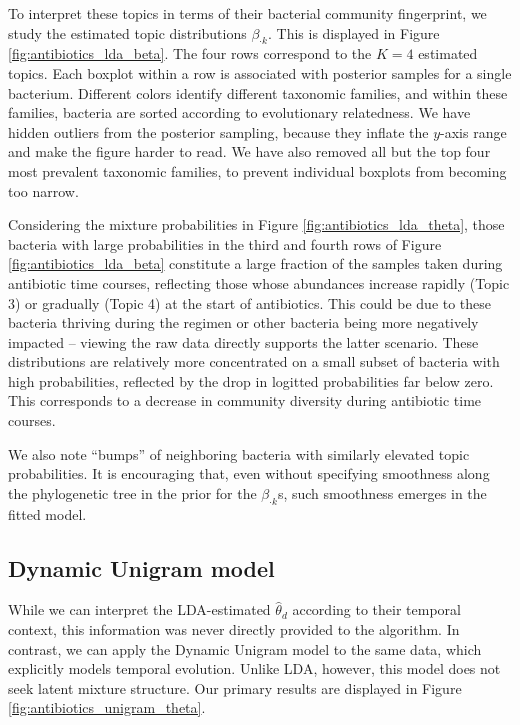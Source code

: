 \documentclass[oupdraft]{bio}
\begin{document}
To interpret these topics in terms of their bacterial community fingerprint, we
study the estimated topic distributions $\beta_{\cdot k}$. This is displayed in
Figure \ref{fig:antibiotics_lda_beta}. The four rows correspond to the $K = 4$
estimated topics. Each boxplot within a row is associated with posterior samples
for a single bacterium. Different colors identify different taxonomic families,
and within these families, bacteria are sorted according to evolutionary
relatedness. We have hidden outliers from the posterior sampling, because they
inflate the $y$-axis range and make the figure harder to read. We have also
removed all but the top four most prevalent taxonomic families, to prevent
individual boxplots from becoming too narrow.

Considering the mixture probabilities in Figure \ref{fig:antibiotics_lda_theta},
those bacteria with large probabilities in the third and fourth rows of Figure
\ref{fig:antibiotics_lda_beta} constitute a large fraction of the samples taken
during antibiotic time courses, reflecting those whose abundances increase
rapidly (Topic 3) or gradually (Topic 4) at the start of antibiotics. This could
be due to these bacteria thriving during the regimen or other bacteria being
more negatively impacted -- viewing the raw data directly supports the latter
scenario. These distributions are relatively more concentrated on a small subset
of bacteria with high probabilities, reflected by the drop in logitted
probabilities far below zero. This corresponds to a decrease in community
diversity during antibiotic time courses.

We also note ``bumps'' of neighboring bacteria with similarly elevated topic
probabilities. It is encouraging that, even without specifying smoothness along
the phylogenetic tree in the prior for the $\beta_{\cdot k}$s, such smoothness
emerges in the fitted model.

\subsection{Dynamic Unigram model}
\label{sec:antibiotics_unigram}

While we can interpret the LDA-estimated $\hat{\theta}_{d}$ according to their
temporal context, this information was never directly provided to the algorithm.
In contrast, we can apply the Dynamic Unigram model to the same data, which
explicitly models temporal evolution. Unlike LDA, however, this model does not
seek latent mixture structure. Our primary results are displayed in Figure
\ref{fig:antibiotics_unigram_theta}.
\end{document}
